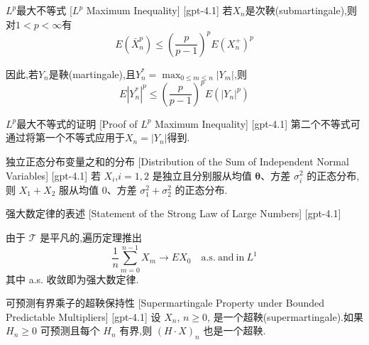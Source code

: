 \documentclass[UTF8]{ctexart}
\begin{document}
    
    
    \begin{thm}
        {$L^p$最大不等式}
        [$L^p$ Maximum Inequality]
        [gpt-4.1]
        若$X_n$是次鞅(submartingale),则对$1 < p < \infty$有
\[
E(\bar{X}_n^p) \leq \left(\frac{p}{p-1}\right)^p E(X_n^{+})^p
\]

因此,若$Y_n$是鞅(martingale),且$Y_n^* = \max_{0 \leq m \leq n} |Y_m|$,则
\[
E|Y_n^*|^p \leq \left(\frac{p}{p-1}\right)^p E(|Y_n|^p)
\]

    \end{thm}
    
    
    
    \begin{prf}
        {$L^p$最大不等式的证明}
        [Proof of $L^p$ Maximum Inequality]
        [gpt-4.1]
        第二个不等式可通过将第一个不等式应用于$X_n = |Y_n|$得到.
    \end{prf}
    
    
    
    \begin{crl}
        {独立正态分布变量之和的分布}
        [Distribution of the Sum of Independent Normal Variables]
        [gpt-4.1]
        若 $X_{i}$,$i=1,2$ 是独立且分别服从均值 $\boldsymbol{\theta}$、方差 $\sigma_{i}^2$ 的正态分布,则 $X_1 + X_2$ 服从均值 $0$、方差 $\sigma_1^2 + \sigma_2^2$ 的正态分布.
    \end{crl}
    
    
    
    \begin{thm}
        {强大数定律的表述}
        [Statement of the Strong Law of Large Numbers]
        [gpt-4.1]
        
由于 $\mathcal{T}$ 是平凡的,遍历定理推出
\[
\frac{1}{n} \sum_{m=0}^{n-1} X_m \to E X_0 \quad \mathrm{a.s.}~\mathrm{and~in~} L^1
\]
其中 a.s. 收敛即为强大数定律.

    \end{thm}
    
    
    
    \begin{thm}
        {可预测有界乘子的超鞅保持性}
        [Supermartingale Property under Bounded Predictable Multipliers]
        [gpt-4.1]
        设 $X_n$, $n \geq 0$, 是一个超鞅(supermartingale).如果 $H_n \geq 0$ 可预测且每个 $H_n$ 有界,则 $(H \cdot X)_n$ 也是一个超鞅.
    \end{thm}
    
\end{document}
